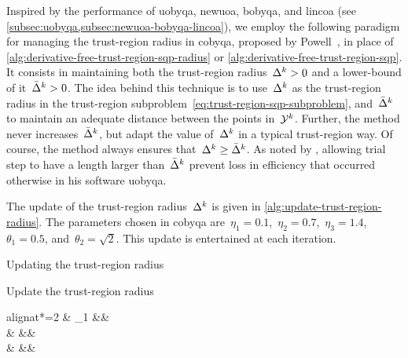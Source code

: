 Inspired by the performance of \gls{uobyqa}, \gls{newuoa}, \gls{bobyqa}, and \gls{lincoa} (see \cref{subsec:uobyqa,subsec:newuoa-bobyqa-lincoa}), we employ the following paradigm for managing the trust-region radius in \gls{cobyqa}, proposed by Powell~\cite{Powell_2002,Powell_2006,Powell_2009}, in place of \cref{alg:derivative-free-trust-region-sqp-radius} or \cref{alg:derivative-free-trust-region-sqp}.
It consists in maintaining both the trust-region radius~$\rad[k] > 0$ and a lower-bound of it~$\radlb[k] > 0$.
The idea behind this technique is to use~$\rad[k]$ as the trust-region radius in the trust-region subproblem~\cref{eq:trust-region-sqp-subproblem}, and~$\radlb[k]$ to maintain an adequate distance between the points in~$\xpt[k]$.
Further, the method never increases~$\radlb[k]$, but adapt the value of~$\rad[k]$ in a typical trust-region way.
Of course, the method always ensures that~$\rad[k] \ge \radlb[k]$.
As noted by \citeauthor{Powell_2002}, allowing trial step to have a length larger than~$\radlb[k]$ prevent loss in efficiency that occurred otherwise in his software \gls{uobyqa}.

The update of the trust-region radius~$\rad[k]$ is given in \cref{alg:update-trust-region-radius}.
The parameters chosen in \gls{cobyqa} are~$\eta_1 = 0.1$,~$\eta_2 = 0.7$,~$\eta_3 = 1.4$,~$\theta_1 = 0.5$, and~$\theta_2 = \sqrt{2}$.
This update is entertained at each iteration.

\begin{algorithm}
    \caption{Updating the trust-region radius}
    \label{alg:update-trust-region-radius}
    \DontPrintSemicolon
    Update the trust-region radius
    \begin{algoempheq}[left={\rad[k + 1] \gets \empheqlbrace}]{alignat*=2}
        & \theta_1 \rad[k]                                                                      && \quad {}\\
        & \min \set{\theta_1 \rad[k], \norm{\step}}                                             && \quad {}\\
        & \min {}  && \quad {}
    \end{algoempheq}
    \If{$\rad[k + 1] \le \eta_3 \radlb[k]$}{
        $\rad[k + 1] \gets \radlb[k]$\;
    }
\end{algorithm}

